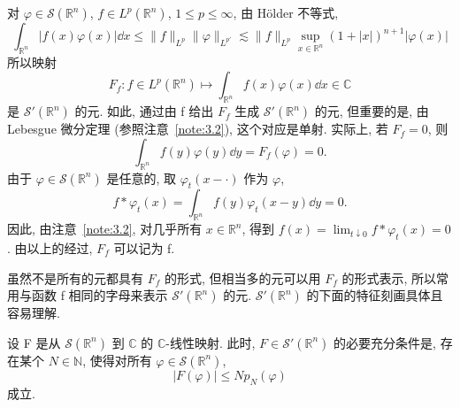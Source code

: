 \begin{example}\label{exa:5.9}
对 $\varphi \in \mathcal{S}(\mathbb{R}^{n})$, $f \in L^{p}(\mathbb{R}^{n})$, $1 \leq p \leq \infty$, 由 Hölder 不等式,
\[
\int_{\mathbb{R}^{n}}|f(x)\varphi(x)|\dd x \leq \|f\|_{L^{p}}\|\varphi\|_{L^{p'}} \lesssim \|f\|_{L^{p}}\sup_{x \in \mathbb{R}^{n}}(1+|x|)^{n+1}|\varphi(x)|
\]
所以映射
\[
F_{f}: f \in L^{p}(\mathbb{R}^{n}) \mapsto \int_{\mathbb{R}^{n}}f(x)\varphi(x)\dd x \in \mathbb{C}
\]
是 $\mathcal{S}'(\mathbb{R}^{n})$ 的元. 如此, 通过由 f 给出 $F_{f}$ 生成 $\mathcal{S}'(\mathbb{R}^{n})$ 的元, 但重要的是, 由 Lebesgue 微分定理 (参照注意~\ref{note:3.2}), 这个对应是单射. 实际上, 若 $F_{f} = 0$, 则
\[
\int_{\mathbb{R}^{n}}f(y)\varphi(y)\dd y = F_{f}(\varphi) = 0.
\]
由于 $\varphi \in \mathcal{S}(\mathbb{R}^{n})$ 是任意的, 取 $\varphi_{t}(x - \cdot)$ 作为 $\varphi$,
\[
f * \varphi_{t}(x) = \int_{\mathbb{R}^{n}}f(y)\varphi_{t}(x-y)\dd y = 0.
\]
因此, 由注意~\ref{note:3.2}, 对几乎所有 $x \in \mathbb{R}^{n}$, 得到 $f(x) = \lim_{t \downarrow 0}f * \varphi_{t}(x) = 0$. 由以上的经过, $F_{f}$ 可以记为 f.
\end{example}

虽然不是所有的元都具有 $F_{f}$ 的形式, 但相当多的元可以用 $F_{f}$ 的形式表示, 所以常用与函数 f 相同的字母来表示 $\mathcal{S}'(\mathbb{R}^{n})$ 的元. $\mathcal{S}'(\mathbb{R}^{n})$ 的下面的特征刻画具体且容易理解.

\begin{theorem}\label{thm:5.3}
设 F 是从 $\mathcal{S}(\mathbb{R}^{n})$ 到 $\mathbb{C}$ 的 $\mathbb{C}$-线性映射. 此时, $F \in \mathcal{S}'(\mathbb{R}^{n})$ 的必要充分条件是, 存在某个 $N \in \mathbb{N}$, 使得对所有 $\varphi \in \mathcal{S}(\mathbb{R}^{n})$,
\begin{equation}\tag{5.5}
|F(\varphi)| \leq Np_{N}(\varphi)
\label{eq:5.5}
\end{equation}
成立.
\end{theorem}

